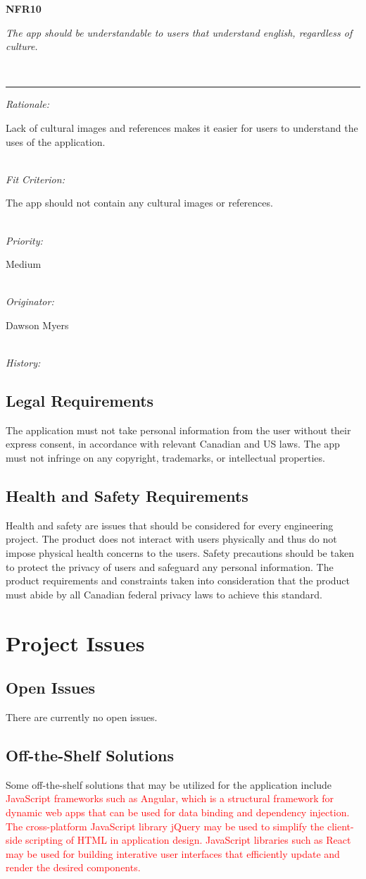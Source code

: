 \documentclass[12pt, titlepage]{article}
\newcommand{\pbox}[1]{\parbox[t]{.85\linewidth}{#1}
}
\newcommand{\myline}{%
	\kern1pt %
	\hrule height 0.8pt
	\kern3pt %
}
\newcommand{\requirement}[7]{

	\noindent
	\vspace{5pt}
	\parbox{\linewidth}{
		\fontsize{10pt}{5pt}\selectfont
		\noindent\textbf{#1} \hspace{26pt}\pbox{\textit{#2}} \\
		\myline
		\textit{Rationale:}	\hspace{10pt} \pbox{#3} \\
		\textit{Fit Criterion:} \pbox{#4} \\
		\textit{Priority:} \hspace{18pt} \pbox{#5} \\
		\textit{Originator:} \hspace{7pt} \pbox{#6} \\
		\textit{History:} \hspace{25pt}{#7} \\
}}
\begin{document}
\requirement{NFR10}{The app should be understandable to users that understand english, regardless of culture.
}{Lack of cultural images and references makes it easier for users to understand the uses of the application.
}{The app should not contain any cultural images or references.
}{Medium}{Dawson Myers}{October 6, 2017}
\subsection{Legal Requirements}

The application must not take personal information from the user without their express consent, in accordance with relevant Canadian and US laws. The app must not infringe on any copyright, trademarks, or intellectual properties.

\subsection{Health and Safety Requirements}
Health and safety are issues that should be considered for every engineering project. The product does not interact with users physically and thus do not impose physical health concerns to the users. Safety precautions should be taken to protect the privacy of users and safeguard any personal information. The product requirements and constraints taken into consideration that the product must abide by all Canadian federal privacy laws to achieve this standard.

\section{Project Issues}

\subsection{Open Issues}
There are currently no open issues.

\subsection{Off-the-Shelf Solutions} \label{otss}
Some off-the-shelf solutions that may be utilized for the application include \textcolor{red}{JavaScript frameworks such as Angular, which is a structural framework for dynamic web apps that can be used for data binding and dependency injection. The cross-platform JavaScript library jQuery may be used to simplify the client-side scripting of HTML in application design. JavaScript libraries such as React may be used for building interative user interfaces that efficiently update and render the desired components.}
\end{document}
